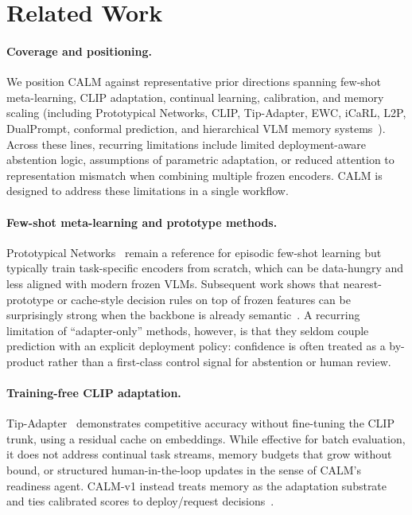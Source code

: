 \documentclass{article}
\begin{document}
\section{Related Work}
\paragraph{Coverage and positioning.}
We position CALM against representative prior directions spanning few-shot meta-learning, CLIP adaptation, continual learning, calibration, and memory scaling (including Prototypical Networks, CLIP, Tip-Adapter, EWC, iCaRL, L2P, DualPrompt, conformal prediction, and hierarchical VLM memory systems~\citep{snell2017proto,radford2021clip,zhang2022tipadapter,kirkpatrick2017ewc,rebuffi2017icarl,wang2022l2p,wang2022dualprompt,angelopoulos2021conformal,deepseekocr2024,deepseekvl22024}). Across these lines, recurring limitations include limited deployment-aware abstention logic, assumptions of parametric adaptation, or reduced attention to representation mismatch when combining multiple frozen encoders. CALM is designed to address these limitations in a single workflow.

\paragraph{Few-shot meta-learning and prototype methods.}
Prototypical Networks~\citep{snell2017proto} remain a reference for episodic few-shot learning but typically train task-specific encoders from scratch, which can be data-hungry and less aligned with modern frozen VLMs. Subsequent work shows that nearest-prototype or cache-style decision rules on top of frozen features can be surprisingly strong when the backbone is already semantic~\citep{radford2021clip,zhang2022tipadapter}. A recurring limitation of ``adapter-only'' methods, however, is that they seldom couple prediction with an explicit deployment policy: confidence is often treated as a by-product rather than a first-class control signal for abstention or human review.

\paragraph{Training-free CLIP adaptation.}
Tip-Adapter~\citep{zhang2022tipadapter} demonstrates competitive accuracy without fine-tuning the CLIP trunk, using a residual cache on embeddings. While effective for batch evaluation, it does not address continual task streams, memory budgets that grow without bound, or structured human-in-the-loop updates in the sense of CALM's readiness agent. CALM-v1 instead treats memory as the adaptation substrate and ties calibrated scores to deploy/request decisions~\citep{guo2017calibration}.
\end{document}
